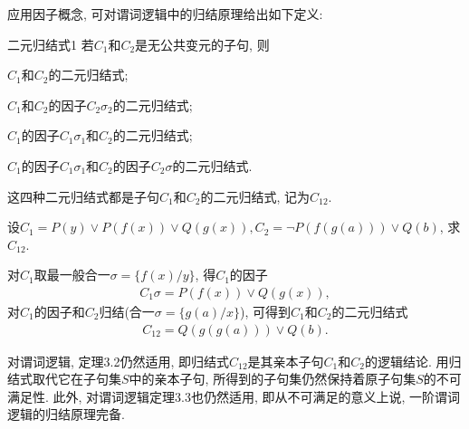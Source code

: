 应用因子概念, 可对谓词逻辑中的归结原理给出如下定义:
\begin{mydef}{二元归结式}{1}
若$C_1$和$C_2$是无公共变元的子句, 则

\quad   {} $C_1$和$C_2$的二元归结式;

\quad   {}  $C_1$和$C_2$的因子$C_2 \sigma_2$的二元归结式;

\quad   {}  $C_1$的因子$C_1\sigma_1$和$C_2$的二元归结式;

\quad   {} $C_1$的因子$C_1\sigma_1$和$C_2$的因子$C_2 \sigma$的二元归结式.

这四种二元归结式都是子句$C_1$和$C_2$的二元归结式, 记为$C_{12}$.
\end{mydef}
\begin{example}
    设$C_1=P(y)\vee P(f(x))\vee Q(g(x)), C_2 =\neg P(f(g(a)))\vee Q(b)$, 求$C_{12}$.
\end{example}
\begin{result}
    对$C_1$取最一般合一$\sigma =\{f(x)/y\}$, 得$C_1$的因子
\begin{align}
    C_1\sigma =P(f(x))\vee Q(g(x)),
\end{align}
对$C_1$的因子和$C_2$归结(合一$\sigma=\{g(a)/x\}$), 可得到$C_1$和$C_2$的二元归结式
\begin{align}
    C_{12}=Q(g(g(a)))\vee Q(b).
\end{align}
\end{result}
\begin{remark}
    对谓词逻辑, 定理3.2仍然适用, 即归结式$C_{12}$是其亲本子句$C_1$和$C_2$的逻辑结论. 用归结式取代它在子句集$S$中的亲本子句, 所得到的子句集仍然保持着原子句集$S$的不可满足性.
此外, 对谓词逻辑定理3.3也仍然适用, 即从不可满足的意义上说, 一阶谓词逻辑的归结原理完备.
\end{remark}
